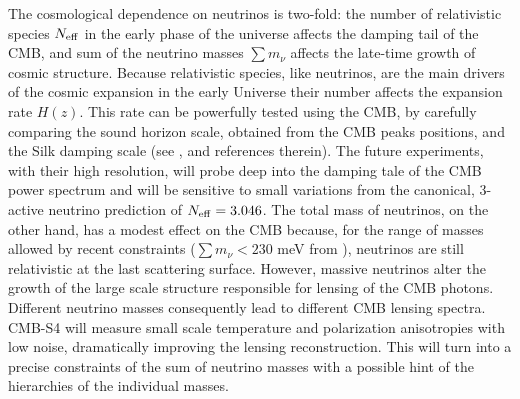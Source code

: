 \documentclass[aps,prd,reprint,superscriptaddress]{revtex4-1}
\begin{document}
The cosmological dependence on neutrinos is two-fold: the number of relativistic species $N_{\rm eff}$ in the early phase of the universe affects the damping tail of the CMB, and sum of the neutrino masses $\sum m_\nu$ affects the late-time growth of cosmic structure.
Because relativistic species, like neutrinos, are the main drivers of the cosmic expansion in the early Universe their number affects the expansion rate $H(z)$. This rate can be powerfully tested using the CMB, by carefully comparing the sound horizon scale, obtained from the CMB peaks positions, and the Silk damping scale (see \cite{2013arXiv1309.5383A}, \cite{2013PhRvD..87h3008H} and references therein). 
The future experiments, with their high resolution, will probe deep into the damping tale of the CMB power spectrum and will be sensitive to small variations from the canonical, 3-active neutrino prediction of $N_{\rm eff}=3.046$. The total mass of neutrinos, on the other hand, has a modest effect on the CMB because, for the range of masses allowed by recent constraints ($\sum m_{\nu}<230$ meV from \cite{planck-collaboration:2014}), neutrinos are still relativistic at the last scattering surface. However, massive neutrinos alter the growth of the large scale structure responsible for lensing of the CMB photons. Different neutrino masses consequently lead to different CMB lensing spectra. CMB-S4 will measure small scale temperature and polarization anisotropies with low noise, dramatically improving the lensing reconstruction. This will turn into a  precise constraints of the sum of neutrino masses with a possible hint of the hierarchies of the individual masses. %
\end{document}
